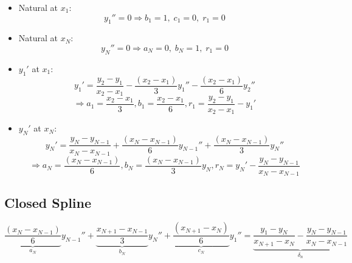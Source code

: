 \documentclass[aps,onecolumn,11pt]{revtex4}
\begin{document}
\begin{itemize}
\item Natural at $x_1$:
\begin{equation}
	y_1'' = 0 \Rightarrow  b_1=1,\;c_1=0,\;r_1=0
\end{equation}
\item Natural at $x_N$:
\begin{equation}
	y_N'' = 0 \Rightarrow a_N=0,\;b_N=1,\;r_1=0
\end{equation}

\item $y_1'$ at $x_1$:
\begin{equation}
	y_1' = \dfrac{y_2-y_1}{x_2-x_1} - \dfrac{(x_{2} - x_1)}{3} y_1'' - \dfrac{(x_{2} - x_1)}{6} y_{2}''
\end{equation}
$$
	\Rightarrow a_1=\dfrac{x_2-x_1}{3}, b_1=\dfrac{x_2-x_1}{6}, r_1 = \dfrac{y_2-y_1}{x_2-x_1} - y_1'
$$

\item $y_N'$ at $x_N$:
\begin{equation}
	y_N' = \dfrac{y_{N}-y_{N-1}}{x_{N}-x_{N-1}} + \dfrac{(x_{N} - x_{N-1})}{6} y_{N-1}'' + \dfrac{(x_{N} - x_{N-1})}{3} y_{N}''
\end{equation}
$$
	\Rightarrow a_N= \dfrac{(x_{N} - x_{N-1})}{6} , b_N = \dfrac{(x_{N} - x_{N-1})}{3} y_{N}, r_N = y_N' - \dfrac{y_{N}-y_{N-1}}{x_{N}-x_{N-1}}
$$
\end{itemize}

\subsection{Closed Spline}

\begin{equation}
  \underbrace{\dfrac{(x_{N} - x_{N-1})}{6}}_{a_N} y_{N-1}''
+ \underbrace{\dfrac{x_{N+1}-x_{N-1}}{3}}_{b_N} y_N''
+ \underbrace{\dfrac{(x_{N+1} - x_N)}{6}}_{c_N} y_{1}'' = 
\underbrace{\dfrac{y_{1}-y_{N}}{x_{N+1}-x_{N}} - \dfrac{y_{N}-y_{N-1}}{x_{N}-x_{N-1}}}_{\delta_n}
\end{equation}
\end{document}
